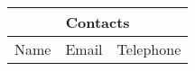 \begin{longtable}{|c|c|c|}
\hline
\multicolumn{3}{|c|}{Contacts} \\
\hline
Name & Email & Telephone\\
\hline
\end{longtable}
